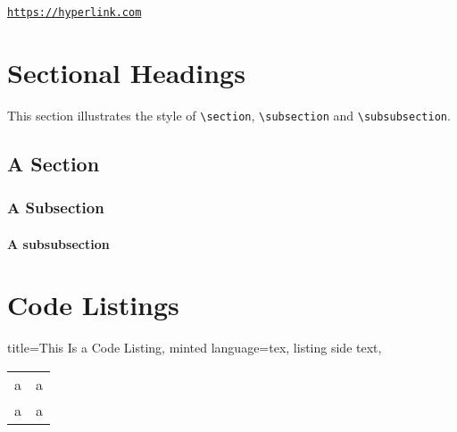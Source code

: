\documentclass[a4paper,11pt,oneside,showtrims]{alpenthesis}
\begin{document}
\href{https://hyperlink.com}{\nolinkurl{https://hyperlink.com}}

\chapter{Sectional Headings}

This section illustrates the  style of \verb|\section|, \verb|\subsection| and
\verb|\subsubsection|.

\section{A Section}
\lipsum[2]

\subsection{A Subsection}
\lipsum[1]

\subsubsection{A subsubsection}
\lipsum[2]

\chapter{Code Listings}
\tikzset{external/export next=false}%
\begin{tcblisting}{%
        title=This Is a Code Listing,
        minted language=tex,
        listing side text,
        }
    \begin{tabular}{ll}
        a & a \\
        a & a \\
    \end{tabular}
\end{tcblisting}

\tikzset{external/export next=false}%
\begin{tcolorbox}[title=test]
    \lipsum[2]
\end{tcolorbox}
\end{document}
